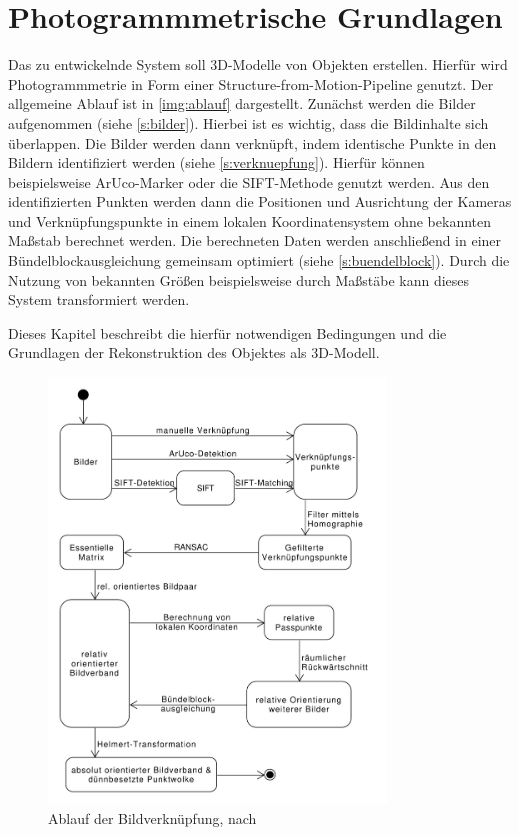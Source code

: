 \documentclass[./00PhotoBox.tex]{subfiles}
\begin{document}
\chapter{Photogrammmetrische Grundlagen}
\label{c:photogrammmetrie}
Das zu entwickelnde System soll 3D-Modelle von Objekten erstellen. Hierfür wird Photogrammmetrie in Form einer Structure-from-Motion-Pipeline genutzt.
Der allgemeine Ablauf ist in \autoref{img:ablauf} dargestellt. Zunächst werden die Bilder aufgenommen (siehe \autoref{s:bilder}). Hierbei ist es wichtig, dass die Bildinhalte sich überlappen. 
Die Bilder werden dann verknüpft, indem identische Punkte in den Bildern identifiziert werden  (siehe \autoref{s:verknuepfung}). Hierfür können beispielsweise ArUco-Marker oder die SIFT-Methode genutzt werden. 
Aus den identifizierten Punkten werden dann die Positionen und Ausrichtung der Kameras und Verknüpfungspunkte in einem lokalen Koordinatensystem ohne bekannten Maßstab berechnet werden. Die berechneten Daten werden anschließend in einer Bündelblockausgleichung gemeinsam optimiert (siehe \autoref{s:buendelblock}). Durch die Nutzung von bekannten Größen beispielsweise durch Maßstäbe kann dieses System transformiert werden.

Dieses Kapitel beschreibt die hierfür notwendigen Bedingungen und die Grundlagen der Rekonstruktion des Objektes als 3D-Modell.

\begin{figure}
    \centering
    \includegraphics[width=0.8\textwidth]{./img/Ablauf.pdf}
    \centering
    \caption{Ablauf der Bildverknüpfung, nach \citealt[S. 492]{luhmann}} %
    \label{img:ablauf} %
\end{figure}
\end{document}
